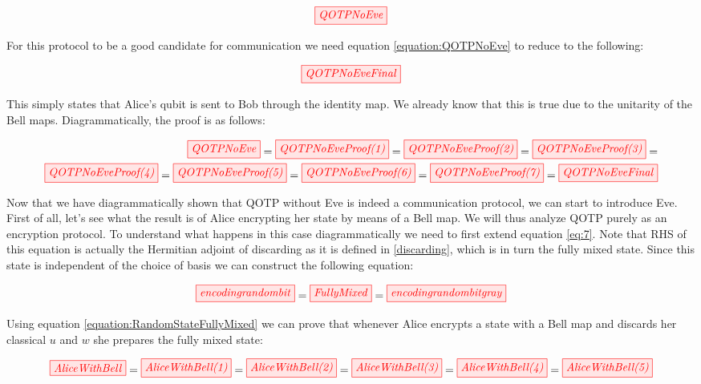 \documentclass[]{article}
\begin{document}
\begin{equation}
	\tikzfig{QOTPNoEve}
	\label{equation:QOTPNoEve}
\end{equation}

For this protocol to be a good candidate for communication we need equation \ref{equation:QOTPNoEve} to reduce to the following: 

\begin{equation}
	\tikzfig{QOTPNoEveFinal}
\end{equation}

This simply states that Alice's qubit is sent to Bob through the identity map. We already know that this is true due to the unitarity of the Bell maps. Diagrammatically, the proof is as follows:

\begin{equation}
	\begin{split}
	\tikzfig{QOTPNoEve} = 
	\tikzfig{QOTPNoEveProof(1)} = 
	\tikzfig{QOTPNoEveProof(2)} = 
	\tikzfig{QOTPNoEveProof(3)} = \\
	\tikzfig{QOTPNoEveProof(4)} =
	\tikzfig{QOTPNoEveProof(5)} =
	\tikzfig{QOTPNoEveProof(6)} =
	\tikzfig{QOTPNoEveProof(7)} =
	\tikzfig{QOTPNoEveFinal}
	\end{split}
\end{equation}

Now that we have diagrammatically shown that QOTP without Eve is indeed a communication protocol, we can start to introduce Eve. First of all, let's see what the result is of Alice encrypting her state by means of a Bell map. We will thus analyze QOTP purely as an encryption protocol. To understand what happens in this case diagrammatically we need to first extend equation \ref{eq:7}. Note that RHS of this equation is actually the Hermitian adjoint of discarding as it is defined in \ref{discarding}, which is in turn the fully mixed state. Since this state is independent of the choice of basis we can construct the following equation:

\begin{equation}
	\tikzfig{encodingrandombit} = \tikzfig{FullyMixed} = \tikzfig{encodingrandombitgray}
	\label{equation:RandomStateFullyMixed}
\end{equation}

Using equation \ref{equation:RandomStateFullyMixed} we can prove that whenever Alice encrypts a state with a Bell map and discards her classical $u$ and $w$ she prepares the fully mixed state:

\begin{equation}
	\label{equation:AliceWithBell}
	\tikzfig{AliceWithBell} = \tikzfig{AliceWithBell(1)} = \tikzfig{AliceWithBell(2)} = \tikzfig{AliceWithBell(3)} = \tikzfig{AliceWithBell(4)} =\tikzfig{AliceWithBell(5)}
\end{equation}
\end{document}
